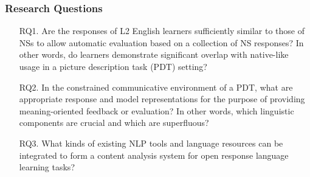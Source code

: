 \documentclass[handout,xcolor={dvipsnames}]{beamer}
\begin{document}
\begin{frame}
\frametitle{Research Questions}
\small
\pause
\begin{itemize}
\pause
\vspace{2em}
\item[RQ1.]{Are the responses of L2 English learners sufficiently similar to those of NSs to allow automatic evaluation based on a collection of NS responses? In other words, do learners demonstrate significant overlap with native-like usage in a picture description task (PDT) setting?} %
\vspace{2em}
\pause
\item[RQ2.]{In the constrained communicative environment of a PDT, what are appropriate response and model representations for the purpose of providing meaning-oriented feedback or evaluation? In other words, which linguistic components are crucial and which are superfluous?}

\pause
\vspace{2em}
\item[RQ3.]{What kinds of existing NLP tools and language resources can be integrated to form a content analysis system for open response language learning tasks?}
\end{itemize}
\end{frame}
\end{document}
